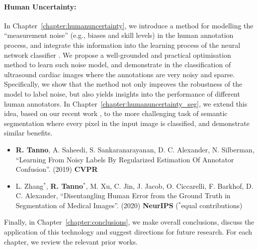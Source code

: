\paragraph{Human Uncertainty:} In Chapter~\ref{chapter:humanuncertainty}, we introduce a method for modelling the ``measurement noise'' (e.g., biases and skill levels) in the human annotation process, and integrate this information into the learning process of the neural network classifier \cite{tanno2019learning}. We propose a well-grounded and practical optimisation method to learn such noise model, and demonstrate in the classification of ultrasound cardiac images where the annotations are very noisy and sparse. Specifically, we show that the method not only improves the robustness of the model to label noise, but also yields insights into the performance of different human annotators. In Chapter~\ref{chapter:humanuncertainty_seg}, we 
extend this idea, based on our recent work \cite{zhang2020disentangling}, to the more challenging task of semantic segmentation where every pixel in the input image is classified, and demonstrate similar benefits. 
\begin{itemize}
	\footnotesize
	\item \textbf{R. Tanno}, A. Saheedi, S. Sankaranarayanan, D. C. Alexander, N. Silberman, ``Learning From Noisy Labels By Regularized Estimation Of Annotator Confusion''.  (2019) \textbf{CVPR}
	\item L. Zhang$^*$, \textbf{R. Tanno}$^*$, M. Xu, C. Jin, J. Jacob, O. Ciccarelli, F. Barkhof, D. C. Alexander, ``Disentangling Human Error from the Ground Truth in Segmentation of Medical Images''.  (2020) \textbf{NeurIPS} ($^*$equal contributions)
\end{itemize}


Finally, in Chapter~\ref{chapter:conclusions}, we make overall conclusions, discuss the application of this technology and suggest directions for future research. For each chapter, we review the relevant prior works. 

\vspace{-2mm}
